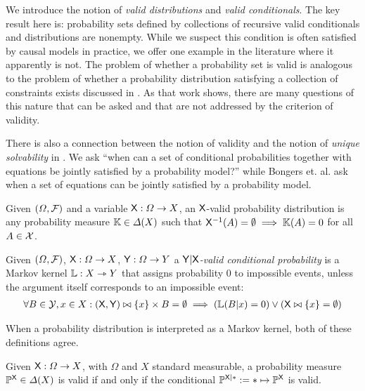 We introduce the notion of \emph{valid distributions} and \emph{valid conditionals}. The key result here is: probability sets defined by collections of recursive valid conditionals and distributions are nonempty. While we suspect this condition is often satisfied by causal models in practice, we offer one example in the literature where it apparently is not. The problem of whether a probability set is valid is analogous to the problem of whether a probability distribution satisfying a collection of constraints exists discussed in \citet{vorobev_consistent_1962}. As that work shows, there are many questions of this nature that can be asked and that are not addressed by the criterion of validity.

There is also a connection between the notion of validity and the notion of \emph{unique solvability} in \citet{bongers_theoretical_2016}. We ask ``when can a set of conditional probabilities together with equations be jointly satisfied by a probability model?'' while Bongers et. al. ask when a set of equations can be jointly satisfied by a probability model.

\begin{definition}\label{def:valid_dist}
Given $(\Omega,\mathcal{F})$ and a variable $\mathsf{X}:\Omega\to X$, an $\mathsf{X}$-valid probability distribution is any probability measure $\mathbb{K}\in \Delta(X)$ such that $\mathsf{X}^{-1}(A)=\emptyset\implies \mathbb{K}(A) = 0$ for all $A\in\mathcal{X}$.
\end{definition}

\begin{definition}\label{def:valid_conditional_prob}
Given $(\Omega,\mathcal{F})$, $\mathsf{X}:\Omega\to X$, $\mathsf{Y}:\Omega\to Y$ a \emph{$\mathsf{Y}|\mathsf{X}$-valid conditional probability} is a Markov kernel $\mathbb{L}:X\rightarrowtriangle Y$ that assigns probability 0 to impossible events, unless the argument itself corresponds to an impossible event:
\begin{align}
    \forall B\in \mathcal{Y}, x\in X: (\mathsf{X},\mathsf{Y})\bowtie \{x\}\times B = \emptyset \implies \left(\mathbb{L}(B|x) = 0\right) \lor \left(\mathsf{X}\bowtie \{x\} = \emptyset\right)
\end{align}
\end{definition}

When a probability distribution is interpreted as a Markov kernel, both of these definitions agree.

\begin{theorem}\label{th:valid_agree}
Given $\mathsf{X}:\Omega\to X$, with $\Omega$ and $X$ standard measurable, a probability measure $\mathbb{P}^{\mathsf{X}}\in \Delta(X)$ is valid if and only if the conditional $\mathbb{P}^{\mathsf{X}|*}:=*\mapsto \mathbb{P}^{\mathsf{X}}$ is valid.
\end{theorem}

